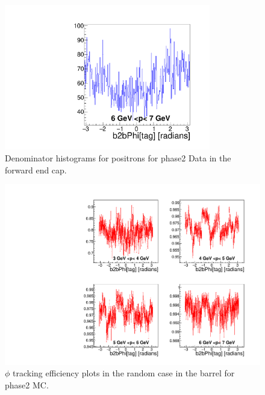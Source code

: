 \documentclass[a4paper,11pt,twosided,final,german,openbib,pdftex,listof=totoc,bibliography=totoc]{scrbook}
\begin{document}
\begin{appendix}
\begin{figure}[!htbp]
	\centering
	\includegraphics[width=9cm]{Plots/master/xPMPhiepFCD_Data}
	\caption[Momentum $\phi$ Positron Forward End Cap Denominator Histogram Phase2 Data]{Denominator histograms for positrons for phase2 Data in the forward end cap.}
	\label{plt:PMPhiepFCD_Data}
\end{figure}
\begin{figure}[!htbp]
	\centering
	\includegraphics[width=\textwidth]{Plots/master/xPMPhiRandomBarrel_MC}
	\caption[Momentum $\phi$ Random Barrel Efficiency Phase2 MC]{$\phi$ tracking efficiency plots in the random case in the barrel for phase2 MC.}
	\label{plt:PMPhiRandomBarrel_MC}
\end{figure}



\end{appendix}
\end{document}
